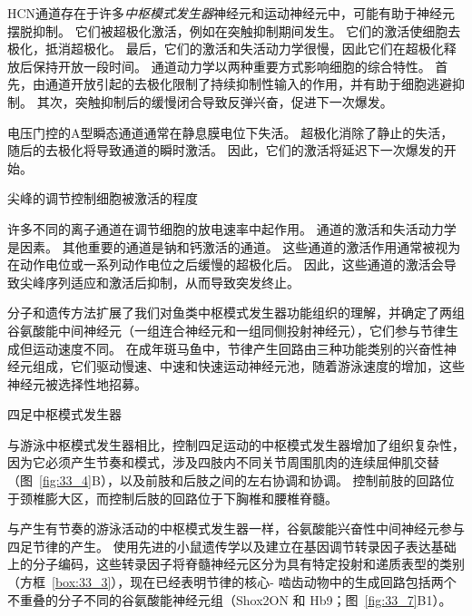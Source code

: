 \begin{proposition}[神经元离子通道有助于中枢模式发生器功能]
	\quad \quad HCN通道存在于许多\textit{中枢模式发生器}神经元和运动神经元中，可能有助于神经元摆脱抑制。
	它们被超极化激活，例如在突触抑制期间发生。
	它们的激活使细胞去极化，抵消超极化。
	最后，它们的激活和失活动力学很慢，因此它们在超极化释放后保持开放一段时间。
	通道动力学以两种重要方式影响细胞的综合特性。
	首先，由通道开放引起的去极化限制了持续抑制性输入的作用，并有助于细胞逃避抑制。
	其次，突触抑制后的缓慢闭合导致反弹兴奋，促进下一次爆发。
	
	\quad \quad 电压门控的A型瞬态通道通常在静息膜电位下失活。
	超极化消除了静止的失活，随后的去极化将导致通道的瞬时激活。
	因此，它们的激活将延迟下一次爆发的开始。
	
	\quad \quad 尖峰的调节控制细胞被激活的程度
	
	\quad \quad 许多不同的离子通道在调节细胞的放电速率中起作用。
	通道的激活和失活动力学是因素。
	其他重要的通道是钠和钙激活的通道。
	这些通道的激活作用通常被视为在动作电位或一系列动作电位之后缓慢的超极化后。
	因此，这些通道的激活会导致尖峰序列适应和激活后抑制，从而导致突发终止。
	
\end{proposition}


分子和遗传方法扩展了我们对鱼类中枢模式发生器功能组织的理解，并确定了两组谷氨酸能中间神经元（一组连合神经元和一组同侧投射神经元），它们参与节律生成但运动速度不同。
在成年斑马鱼中，节律产生回路由三种功能类别的兴奋性神经元组成，它们驱动慢速、中速和快速运动神经元池，随着游泳速度的增加，这些神经元被选择性地招募。


四足中枢模式发生器

与游泳中枢模式发生器相比，控制四足运动的中枢模式发生器增加了组织复杂性，因为它必须产生节奏和模式，涉及四肢内不同关节周围肌肉的连续屈伸肌交替（图~\ref{fig:33_4}B），以及前肢和后肢之间的左右协调和协调。
控制前肢的回路位于颈椎膨大区，而控制后肢的回路位于下胸椎和腰椎脊髓。


与产生有节奏的游泳活动的中枢模式发生器一样，谷氨酸能兴奋性中间神经元参与四足节律的产生。
使用先进的小鼠遗传学以及建立在基因调节转录因子表达基础上的分子编码，这些转录因子将脊髓神经元区分为具有特定投射和递质表型的类别（方框~\ref{box:33_3}），现在已经表明节律的核心- 啮齿动物中的生成回路包括两个不重叠的分子不同的谷氨酸能神经元组（Shox2ON 和 Hb9；图~\ref{fig:33_7}B1）。



